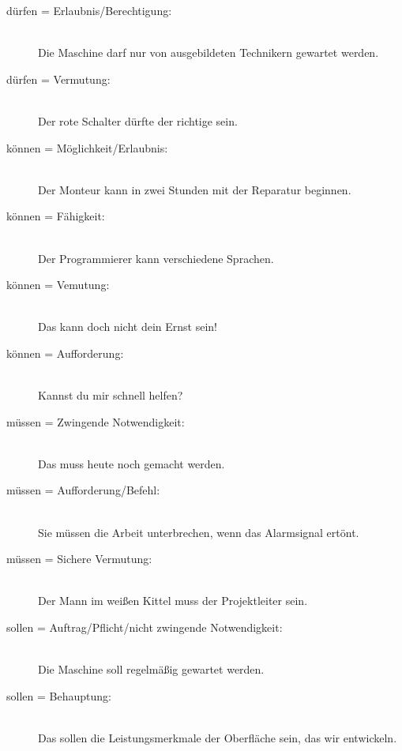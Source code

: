 \documentclass[a4paper,titlepage=true,twoside]{scrartcl}
\begin{document}
\begin{description}
\item[dürfen = Erlaubnis/Berechtigung:]\hspace{0pt}\\ 
Die Maschine darf nur von ausgebildeten Technikern gewartet werden.

\item[dürfen = Vermutung:]\hspace{0pt}\\ 
Der rote Schalter dürfte der richtige sein.

\item[können = Möglichkeit/Erlaubnis:]\hspace{0pt}\\ 
Der Monteur kann in zwei Stunden mit der Reparatur beginnen.

\item[können = Fähigkeit:]\hspace{0pt}\\ 
Der Programmierer kann verschiedene Sprachen.

\item[können = Vemutung:]\hspace{0pt}\\ 
Das kann doch nicht dein Ernst sein!

\item[können = Aufforderung:]\hspace{0pt}\\ 
Kannst du mir schnell helfen?

\item[müssen = Zwingende Notwendigkeit:]\hspace{0pt}\\
Das muss heute noch gemacht werden.

\item[müssen = Aufforderung/Befehl:]\hspace{0pt}\\
Sie müssen die Arbeit unterbrechen, wenn das Alarmsignal ertönt.

\item[müssen = Sichere Vermutung:]\hspace{0pt}\\
Der Mann im weißen Kittel muss der Projektleiter sein.

\item[sollen = Auftrag/Pflicht/nicht zwingende Notwendigkeit:]\hspace{0pt}\\
Die Maschine soll regel\-mäßig gewartet werden.

\item[sollen = Behauptung:]\hspace{0pt}\\
Das sollen die Leistungsmerkmale der Oberfläche sein, das wir entwickeln.
\end{description}
\end{document}
